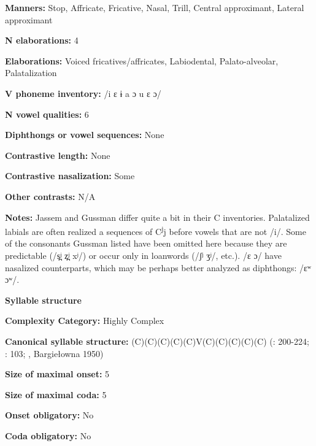\textbf{Manners:} Stop, Affricate, Fricative, Nasal, Trill, Central approximant, Lateral approximant



\textbf{N elaborations:} 4



\textbf{Elaborations:} Voiced fricatives/affricates, Labiodental, Palato-alveolar, Palatalization



\textbf{V phoneme inventory:} /i ɛ ɨ a ɔ u ɛ ɔ/



\textbf{N vowel qualities:} 6



\textbf{Diphthongs or vowel sequences:} None



\textbf{Contrastive length:} None



\textbf{Contrastive nasalization:} Some



\textbf{Other contrasts:} N/A



\textbf{Notes:} Jassem and Gussman differ quite a bit in their C inventories. Palatalized labials are often realized a sequences of C\textsuperscript{j}j before vowels that are not /i/. Some of the consonants Gussman listed have been omitted here because they are predictable (/s̪ʲ z̪ʲ xʲ/) or occur only in loanwords (/ʃʲ ʒʲ/, etc.). /ɛ ɔ/ have nasalized counterparts, which may be perhaps better analyzed as diphthongs: /ɛʷ ɔʷ/.



\textbf{Syllable structure}



\textbf{Complexity Category:} Highly Complex



\textbf{Canonical syllable structure:} (C)(C)(C)(C)(C)V(C)(C)(C)(C)(C) (\citealt{Gussman2007}: 200-224; \citealt{Jassem2003}: 103; \citealt{Zydorowicz2010}, Bargiełowna 1950)



\textbf{Size of maximal onset:} 5



\textbf{Size of maximal coda:} 5



\textbf{Onset obligatory:} No



\textbf{Coda obligatory:} No



